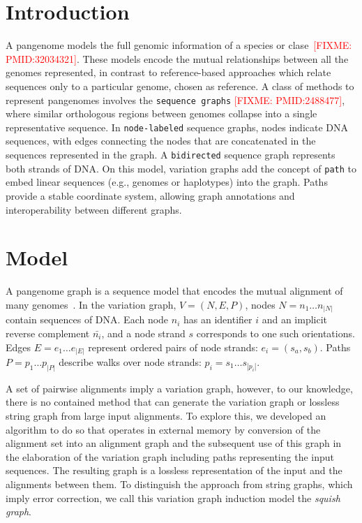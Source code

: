 \documentclass{bioinfo}
\newcommand{\red}[1]{{\textcolor{Red}{#1}}}
\newcommand{\FIXME}[1]{\red{[FIXME: #1]}}
\begin{document}
    \section{Introduction}
    \label{sec:introduction}
    A pangenome models the full genomic information of a species or clase~\FIXME{PMID:32034321}.
    These models encode the mutual relationships between all the genomes represented, in contrast to reference-based approaches which relate sequences only to a particular genome, chosen as reference.
    A class of methods to represent pangenomes involves the \texttt{sequence graphs} \FIXME{PMID:2488477}, where similar orthologous regions between genomes collapse into a single representative sequence.
    In \texttt{node-labeled} sequence graphs, nodes indicate DNA sequences, with edges connecting the nodes that are concatenated in the sequences represented in the graph.
    A \texttt{bidirected} sequence graph represents both strands of DNA.
    On this model, variation graphs add the concept of \texttt{path} to embed linear sequences (e.g., genomes or haplotypes) into the graph\citep{Garrison:2018}.
    Paths provide a stable coordinate system, allowing graph annotations and interoperability between different graphs.


    \section{Model}
    \label{sec:model}
    A pangenome graph is a sequence model that encodes the mutual alignment of many genomes~\citep{Garrison_2019_thesis,Eizenga_2020}.
    In the variation graph, $V = (N, E, P)$, nodes $N = n_1\ldots n_{|N|}$ contain sequences of DNA.
    Each node $n_i$ has an identifier $i$ and an implicit reverse complement $\bar{n_i}$, and a node strand $s$ corresponds to one such orientations.
    Edges $E = e_1\ldots e_{|E|}$ represent ordered pairs of node strands: $e_i = ( s_a, s_b )$.
    Paths $P = p_1\ldots p_{|P|}$ describe walks over node strands: $p_i = s_1 \ldots s_{|p_i|}$.

    A set of pairwise alignments imply a variation graph, however, to our knowledge, there is no contained method that can
    generate the variation graph or lossless string graph from large input alignments.
    To explore this, we developed an algorithm to do so that operates in external memory by conversion of the alignment
    set into an alignment graph and the subsequent use of this graph in the elaboration of the variation graph including paths representing the input sequences.
    The resulting graph is a lossless representation of the input and the alignments between them.
    To distinguish the approach from string graphs, which imply error correction, we call this variation graph induction model the \emph{squish graph}.
\end{document}
